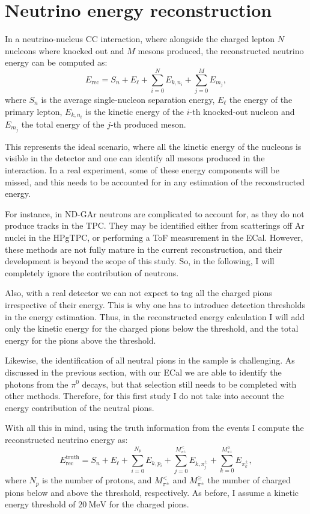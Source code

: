 \section{Neutrino energy reconstruction}
\label{sec:gar_energy}

In a neutrino-nucleus CC interaction, where alongside the charged lepton $N$ nucleons where knocked out and $M$ mesons produced, the reconstructed neutrino energy can be computed as:
\begin{equation}
    E_{\mathrm{rec}} = S_{n} + E_{\ell} + \sum_{i=0}^{N} E_{k,n_{i}} + \sum_{j=0}^{M} E_{m_{j}},
\end{equation}
where $S_{n}$ is the average single-nucleon separation energy, $E_{\ell}$ the energy of the primary lepton, $E_{k,n_{i}}$ is the kinetic energy of the $i$-th knocked-out nucleon and $E_{m_{j}}$ the total energy of the $j$-th produced meson.

This represents the ideal scenario, where all the kinetic energy of the nucleons is visible in the detector and one can identify all mesons produced in the interaction. In a real experiment, some of these energy components will be missed, and this needs to be accounted for in any estimation of the reconstructed energy.

For instance, in ND-GAr neutrons are complicated to account for, as they do not produce tracks in the TPC. They may be identified either from scatterings off Ar nuclei in the HPgTPC, or performing a ToF measurement in the ECal. However, these methods are not fully mature in the current reconstruction, and their development is beyond the scope of this study. So, in the following, I will completely ignore the contribution of neutrons.

Also, with a real detector we can not expect to tag all the charged pions irrespective of their energy. This is why one has to introduce detection thresholds in the energy estimation. Thus, in the reconstructed energy calculation I will add only the kinetic energy for the charged pions below the threshold, and the total energy for the  pions above the threshold.

Likewise, the identification of all neutral pions in the sample is challenging. As discussed in the previous section, with our ECal we are able to identify the photons from the $\pi^{0}$ decays, but that selection still needs to be completed with other methods. Therefore, for this first study I do not take into account the energy contribution of the neutral pions.

With all this in mind, using the truth information from the events I compute the reconstructed neutrino energy as:
\begin{equation}
    E^{\mathrm{truth}}_{\mathrm{rec}} = S_{n} + E_{\ell} + \sum_{i=0}^{N_{p}} E_{k,p_{i}} + \sum_{j=0}^{M_{\pi^{\pm}}^{<}} E_{k,\pi^{\pm}_{j}} + \sum_{k=0}^{M_{\pi^{\pm}}^{\geq}} E_{\pi^{\pm}_{k}},
\end{equation}
where $N_{p}$ is the number of protons, and $M_{\pi^{\pm}}^{<}$ and $M_{\pi^{\pm}}^{\geq}$ the number of charged pions below and above the threshold, respectively. As before, I assume a kinetic energy threshold of $20~\mathrm{MeV}$ for the charged pions.

